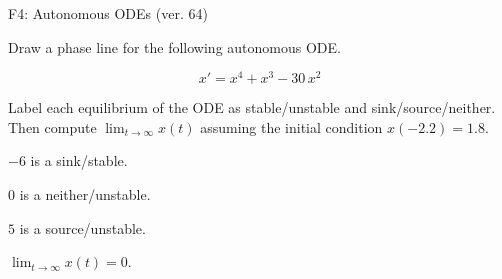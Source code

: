 \begin{exercise}
  \begin{exerciseTitle}F4: Autonomous ODEs (ver. 64)\end{exerciseTitle}
  \begin{exerciseStatement}
    

      Draw a phase line for the following 
      autonomous ODE.
    

    
\[x'= x^{4} + x^{3} - 30 \, x^{2}\]

    

      Label each equilibrium of the ODE
      as stable/unstable and sink/source/neither.
      Then compute \(\lim_{t\to\infty}x(t)\)
      assuming the initial condition
      \(x( -2.2 )= 1.8\).
    

  \end{exerciseStatement}
  \begin{exerciseAnswer}
    

      \(-6\) is a sink/stable.
      
        \(0\) is a neither/unstable.
      
      \(5\) is a source/unstable.
    

    

      \(\lim_{t\to\infty}x(t)=0\).
    

  \end{exerciseAnswer}
\end{exercise}